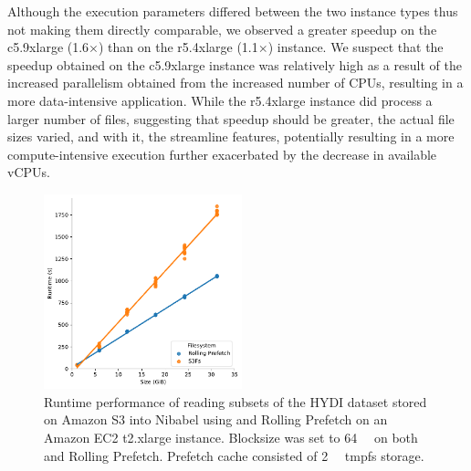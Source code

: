 Although the execution parameters differed between the two instance types thus
not making them directly comparable, we observed a greater speedup on the
c5.9xlarge (1.6$\times$) than on the r5.4xlarge (1.1$\times$) instance. We
suspect that the speedup obtained on the c5.9xlarge instance was relatively high
as a result of the increased parallelism obtained from the increased number of
CPUs, resulting in a more data-intensive application. While the r5.4xlarge
instance did process a larger number of files, suggesting that speedup should be
greater, the actual file sizes varied, and with it, the streamline features,
potentially resulting in a more compute-intensive execution further exacerbated
by the decrease in available vCPUs. 





\begin{figure}
\begin{center}
\includegraphics[height=160pt]{figures/part3-chp1/filesize.pdf}
\caption{Runtime performance of reading subsets of the HYDI dataset stored on
Amazon S3 into Nibabel using \sfs and Rolling Prefetch on an Amazon EC2
t2.xlarge instance. Blocksize was set to \SI{64}{\mebi\byte} on both \sfs and
Rolling Prefetch. Prefetch cache consisted of \SI{2}{\gibi\byte} tmpfs storage.}
\label{fig:filesize}
\end{center}
\end{figure}

